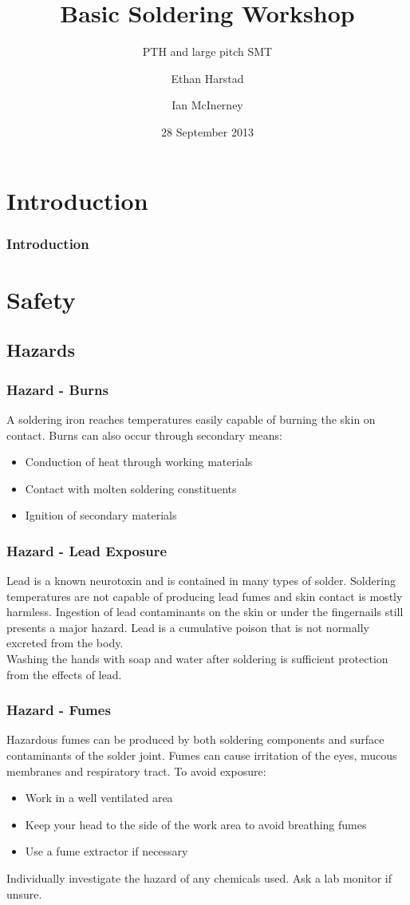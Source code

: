\documentclass{beamer}
\title{Basic Soldering Workshop}
\subtitle{PTH and large pitch SMT}
\author{Ethan Harstad \and Ian McInerney}
\institute{
	Make to Innovate\\
	Dept. of Aerospace Engineering\\
	Iowa State University
}
\date{28 September 2013}
\begin{document}
\begin{frame}[plain]
	\titlepage
\end{frame}

\section{Introduction}
\begin{frame}
	\frametitle{Introduction}
\end{frame}

\section{Safety}
\subsection{Hazards}
\begin{frame}[t]
	\frametitle{Hazard - Burns}
	A soldering iron reaches temperatures easily capable of burning the skin on contact.
	Burns can also occur through secondary means:
	\begin{itemize}
		\item Conduction of heat through working materials
		\item Contact with molten soldering constituents
		\item Ignition of secondary materials
	\end{itemize}
\end{frame}
\begin{frame}[t]
	\frametitle{Hazard - Lead Exposure}
	Lead is a known neurotoxin and is contained in many types of solder. Soldering temperatures are not capable of producing lead fumes and skin contact is mostly harmless. Ingestion of lead contaminants on the skin or under the fingernails still presents a major hazard. Lead is a cumulative poison that is not normally excreted from the body.\\
	Washing the hands with soap and water after soldering is sufficient protection from the effects of lead.
\end{frame}
\begin{frame}[t]
	\frametitle{Hazard - Fumes}
	Hazardous fumes can be produced by both soldering components and surface contaminants of the solder joint. Fumes can cause irritation of the eyes, mucous membranes and respiratory tract. To avoid exposure:
	\begin{itemize}
		\item Work in a well ventilated area
		\item Keep your head to the side of the work area to avoid breathing fumes
		\item Use a fume extractor if necessary
	\end{itemize}
	Individually investigate the hazard of any chemicals used. Ask a lab monitor if unsure.
\end{frame}
\end{document}
